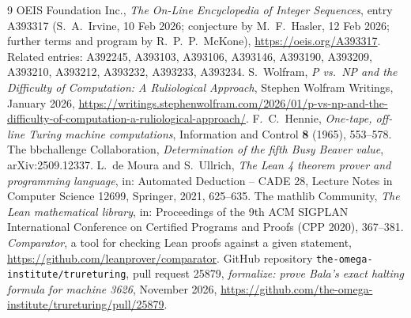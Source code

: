 \documentclass[11pt,a4paper]{amsart}
\theoremstyle{definition}
\theoremstyle{remark}
\begin{document}
\begin{thebibliography}{9}
 OEIS Foundation Inc., \emph{The On-Line Encyclopedia of Integer Sequences}, entry A393317
(S.~A.~Irvine, 10 Feb 2026; conjecture by M.~F.~Hasler, 12 Feb 2026; further terms and program by
R.~P.~P.~McKone), \url{https://oeis.org/A393317}. Related entries: A392245, A393103, A393106, A393146, A393190,
A393209, A393210, A393212, A393232, A393233, A393234.
 S.~Wolfram, \emph{P vs.\ NP and the Difficulty of Computation: A Ruliological Approach},
Stephen Wolfram Writings, January 2026,
\url{https://writings.stephenwolfram.com/2026/01/p-vs-np-and-the-difficulty-of-computation-a-ruliological-approach/}.
 F.~C.~Hennie, \emph{One-tape, off-line Turing machine computations}, Information and Control
\textbf{8} (1965), 553--578.
 The bbchallenge Collaboration, \emph{Determination of the fifth Busy Beaver value},
arXiv:2509.12337.
 L.~de Moura and S.~Ullrich, \emph{The Lean 4 theorem prover and programming language},
in: Automated Deduction -- CADE 28, Lecture Notes in Computer Science 12699, Springer, 2021, 625--635.
 The mathlib Community, \emph{The Lean mathematical library}, in: Proceedings of the 9th ACM
SIGPLAN International Conference on Certified Programs and Proofs (CPP 2020), 367--381.
 \emph{Comparator}, a tool for checking Lean proofs against a given statement,
\url{https://github.com/leanprover/comparator}.
 GitHub repository \texttt{the-omega-institute/trureturing}, pull request 25879,
\emph{formalize: prove Bala's exact halting formula for machine 3626}, November 2026,
\url{https://github.com/the-omega-institute/trureturing/pull/25879}.
\end{thebibliography}
\end{document}
